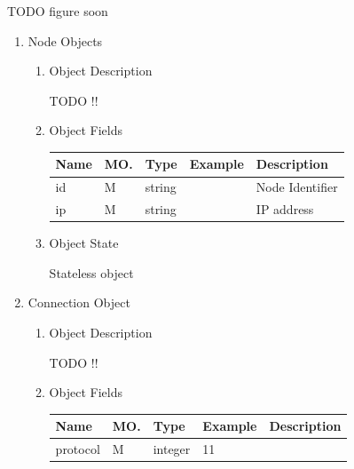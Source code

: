 TODO figure soon

\begin{enumerate}

\item Node Objects

\begin{enumerate}

\item Object Description

TODO !!

\item Object Fields

\begin{table}[H]
\footnotesize
\begin{center}
\begin{tabular}{|p{3cm}|l|p{3cm}|p{3cm}|p{4cm}|} 
\hline
\rowcolor{lightgray}	Name	& MO.	& Type	& Example & 	Description \\
\hline

id 	& M & string & 		& Node Identifier \\
\hline 		

ip & M & string  & 		& IP address \\
\hline

\end{tabular}
\end{center}
\end{table}

\item Object State

Stateless object

\end{enumerate}

\item Connection Object

\begin{enumerate}

\item Object Description

TODO !!

\item Object Fields

\begin{table}[H]
\footnotesize
\begin{center}
\begin{tabular}{|p{3cm}|l|p{3cm}|p{3cm}|p{4cm}|} 
\hline
\rowcolor{lightgray}	Name	& MO.	& Type	& Example & 	Description \\
\hline

protocol 		& M & integer & 11		&  \\
\hline 		


\end{tabular}
\end{center}
\end{table}
\end{enumerate}
\end{enumerate}
